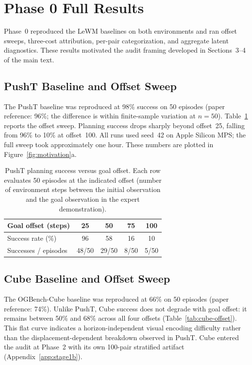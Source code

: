 \section{Phase 0 Full Results}
\label{app:phase0}

Phase~0 reproduced the LeWM baselines on both environments and ran offset
sweeps, three-cost attribution, per-pair categorization, and aggregate latent
diagnostics.  These results motivated the audit framing developed in
Sections~3--4 of the main text.

\subsection{PushT Baseline and Offset Sweep}

The PushT baseline was reproduced at 98\% success on 50 episodes (paper
reference: 96\%; the difference is within finite-sample variation at $n=50$).
Table~\ref{tab:pusht-offset} reports the offset sweep.  Planning success drops
sharply beyond offset~25, falling from 96\% to 10\% at offset~100.  All runs
used seed~42 on Apple Silicon MPS; the full sweep took approximately one hour.
These numbers are plotted in Figure~\ref{fig:motivation}a.

\begin{table}[h]
\centering
\caption{PushT planning success versus goal offset.  Each row evaluates 50
episodes at the indicated offset (number of environment steps between the
initial observation and the goal observation in the expert demonstration).}
\label{tab:pusht-offset}
\begin{tabular}{lcccc}
\toprule
Goal offset (steps) & 25 & 50 & 75 & 100 \\
\midrule
Success rate (\%) & 96 & 58 & 16 & 10 \\
Successes / episodes & 48/50 & 29/50 & 8/50 & 5/50 \\
\bottomrule
\end{tabular}
\end{table}

\subsection{Cube Baseline and Offset Sweep}

The OGBench-Cube baseline was reproduced at 66\% on 50 episodes (paper
reference: 74\%).  Unlike PushT, Cube success does not degrade with goal
offset: it remains between 50\% and 68\% across all four offsets
(Table~\ref{tab:cube-offset}).  This flat curve indicates a
horizon-independent visual encoding difficulty rather than the
displacement-dependent breakdown observed in PushT.  Cube entered the audit
at Phase~2 with its own 100-pair stratified artifact (Appendix~\ref{app:stage1b}).

